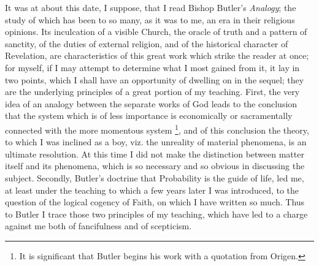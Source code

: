 It was at about this date, I suppose, that I read Bishop Butler's \emph{Analogy}; the study of which has been to so many, as it was to me, an
era in their religious opinions. Its inculcation of a visible Church,
the oracle of truth and a pattern of sanctity, of the duties of
external religion, and of the historical character of Revelation, are
characteristics of this great work which strike the reader at once;
for myself, if I may attempt to determine what I most gained from it,
it lay in two points, which I shall have an opportunity of dwelling on
in the sequel; they are the underlying principles of a great portion
of my teaching. First, the very idea of an analogy between the
separate works of God leads to the conclusion that the system which is
of less importance is economically or sacramentally connected with the
more momentous system \footnote{It is
significant that Butler begins his work with a quotation from Origen.},
and of this conclusion the theory, to which I was inclined as a boy,
viz. the unreality of material phenomena, is an ultimate resolution.
At this time I did not make the distinction between matter itself and
its phenomena, which is so necessary and so obvious in discussing the
subject. Secondly, Butler's doctrine that Probability is the guide of
life, led me, at least under the teaching to which a few years later I
was introduced, to the question of the logical cogency of Faith,
on which I have written so much. Thus to Butler I trace those two
principles of my teaching, which have led to a charge against me both
of fancifulness and of scepticism.

